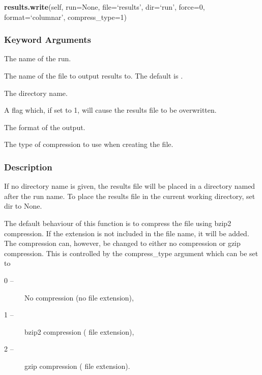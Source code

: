  \textsf{\textbf{results.write}(self, run=None, file=`results', dir=`run', force=0, format=`columnar', compress\_type=1)} 

  
 \subsubsection{Keyword Arguments} 

   The name of the run.   

   The name of the file to output results to.  The default is .   

   The directory name.   

   A flag which, if set to 1, will cause the results file to be overwritten.   

   The format of the output.   

   The type of compression to use when creating the file.  

  

  
 \subsubsection{Description} 

 If no directory name is given, the results file will be placed in a directory named after the run name.  To place the results file in the current working directory, set dir to None. 
  

 The default behaviour of this function is to compress the file using bzip2 compression.  If the extension  is not included in the file name, it will be added.  The compression can, however, be changed to either no compression or gzip compression.  This is controlled by the compress\_type argument which can be set to 
  

 \begin{description} 
 \item[0 --]  No compression (no file extension),  
 \item[1 --]  bzip2 compression ( file extension),  
 \item[2 --]  gzip compression ( file extension).  
 \end{description} 
  

